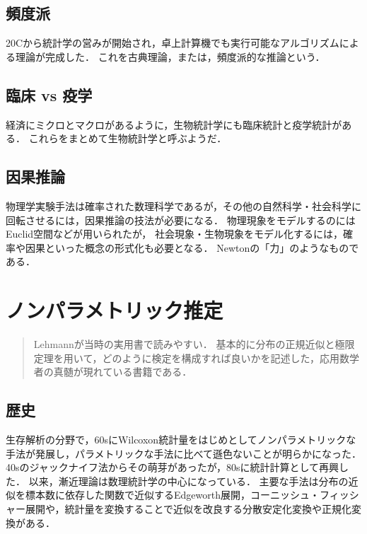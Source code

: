 \documentclass[uplatex,dvipdfmx]{jsreport}
\begin{document}
\section{頻度派}

20Cから統計学の営みが開始され，卓上計算機でも実行可能なアルゴリズムによる理論が完成した．
これを古典理論，または，頻度派的な推論という．

\section{臨床 vs 疫学}

経済にミクロとマクロがあるように，生物統計学にも臨床統計と疫学統計がある．
これらをまとめて生物統計学と呼ぶようだ．

\section{因果推論}

物理学実験手法は確率された数理科学であるが，その他の自然科学・社会科学に
回転させるには，因果推論の技法が必要になる．
物理現象をモデルするのにはEuclid空間などが用いられたが，
社会現象・生物現象をモデル化するには，確率や因果といった概念の形式化も必要となる．
Newtonの「力」のようなものである．

\chapter{ノンパラメトリック推定}

\begin{quotation}
    Lehmann\cite{Lehmann}が当時の実用書で読みやすい．
    基本的に分布の正規近似と極限定理を用いて，どのように検定を構成すれば良いかを記述した，応用数学者の真髄が現れている書籍である．
\end{quotation}

\section{歴史}

\begin{history}[漸近論]
    生存解析の分野で，60sにWilcoxon統計量をはじめとしてノンパラメトリックな手法が発展し，パラメトリックな手法に比べて遜色ないことが明らかになった．
    40sのジャックナイフ法からその萌芽があったが，80sに統計計算として再興した．
    以来，漸近理論は数理統計学の中心になっている．
    主要な手法は分布の近似を標本数に依存した関数で近似するEdgeworth展開，コーニッシュ・フィッシャー展開や，統計量を変換することで近似を改良する分散安定化変換や正規化変換がある．
\end{history}
\end{document}
